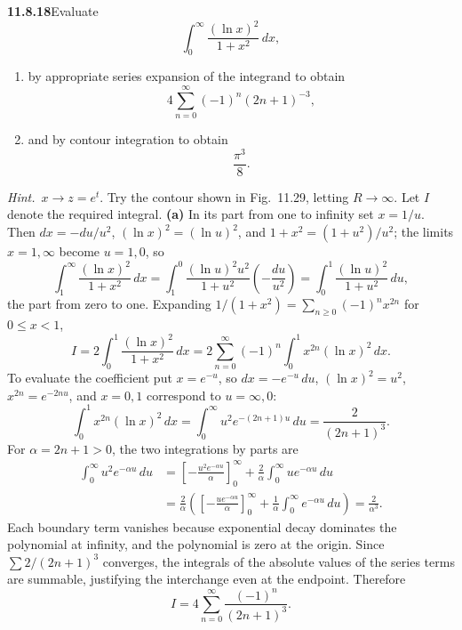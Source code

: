 \par\bigskip
\noindent\textbf{11.8.18}\quad Evaluate
\[
\int_{0}^{\infty}\frac{(\ln x)^{2}}{1+x^{2}}\,dx,
\]
\begin{enumerate}
\item[(a)] by appropriate series expansion of the integrand to obtain
  \[
  4\sum_{n=0}^{\infty}(-1)^{n}(2n+1)^{-3},
  \]
\item[(b)] and by contour integration to obtain
  \[
  \frac{\pi^{3}}{8}.
  \]
\end{enumerate}
\emph{Hint.}~$x\to z=e^{t}$. Try the contour shown in Fig.~11.29, letting
$R\to\infty$.
\solution
Let $I$ denote the required integral.
\textbf{(a)} In its part from one to infinity set $x=1/u$.
Then $dx=-du/u^2$, $(\ln x)^2=(\ln u)^2$, and
$1+x^2=(1+u^2)/u^2$; the limits $x=1,\infty$ become $u=1,0$, so
\[
\int_1^\infty\frac{(\ln x)^2}{1+x^2}\,dx
=\int_1^0\frac{(\ln u)^2u^2}{1+u^2}\left(-\frac{du}{u^2}\right)
=\int_0^1\frac{(\ln u)^2}{1+u^2}\,du,
\]
the part from zero to one. Expanding
$1/(1+x^2)=\sum_{n\ge0}(-1)^nx^{2n}$ for $0\le x<1$,
\[
I=2\int_0^1\frac{(\ln x)^2}{1+x^2}\,dx
=2\sum_{n=0}^{\infty}(-1)^n\int_0^1x^{2n}(\ln x)^2\,dx.
\]
To evaluate the coefficient put $x=e^{-u}$, so $dx=-e^{-u}\,du$,
$(\ln x)^2=u^2$, $x^{2n}=e^{-2nu}$, and $x=0,1$ correspond to
$u=\infty,0$:
\[
\int_0^1x^{2n}(\ln x)^2\,dx
=\int_0^\infty u^2e^{-(2n+1)u}\,du
=\frac2{(2n+1)^3}.
\]
For $\alpha=2n+1>0$, the two integrations by parts are
\[
\begin{aligned}
\int_0^\infty u^2e^{-\alpha u}\,du
&=\left[-\frac{u^2e^{-\alpha u}}\alpha\right]_0^\infty
 +\frac2\alpha\int_0^\infty ue^{-\alpha u}\,du\\
&=\frac2\alpha\left(
\left[-\frac{ue^{-\alpha u}}\alpha\right]_0^\infty
+\frac1\alpha\int_0^\infty e^{-\alpha u}\,du\right)
=\frac2{\alpha^3}.
\end{aligned}
\]
Each boundary term vanishes because exponential decay dominates the
polynomial at infinity, and the polynomial is zero at the origin. Since $\sum 2/(2n+1)^3$ converges, the integrals of the
absolute values of the series terms are summable, justifying the
interchange even at the endpoint. Therefore
\[
\boxed{I=4\sum_{n=0}^{\infty}\frac{(-1)^n}{(2n+1)^3}}.
\]

